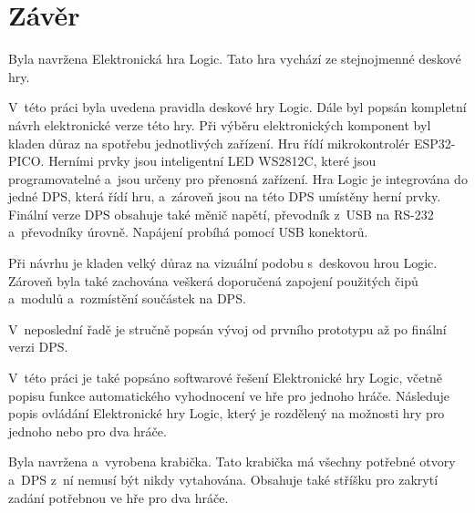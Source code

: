 \chapter*{Závěr}
{}

Byla navržena Elektronická hra Logic. Tato hra vychází ze stejnojmenné deskové hry.

V~této práci byla uvedena pravidla deskové hry Logic. Dále byl popsán kompletní návrh elektronické verze této hry. Při výběru elektronických 
komponent byl kladen důraz na spotřebu jednotlivých zařízení. Hru řídí mikrokontrolér ESP32-PICO. Herními prvky jsou inteligentní LED WS2812C, 
které jsou programovatelné a~jsou určeny pro přenosná zařízení. Hra Logic je integrována do jedné DPS, která řídí hru, a~zároveň jsou na této 
DPS umístěny herní prvky. Finální verze DPS obsahuje také měnič napětí, převodník z~USB na RS-232 a~převodníky úrovně. Napájení probíhá pomocí
USB konektorů.

Při návrhu je kladen velký důraz na vizuální podobu s~deskovou hrou Logic. Zároveň byla také zachována veškerá doporučená zapojení použitých 
čipů a~modulů a~rozmístění součástek na DPS.

V~neposlední řadě je stručně popsán vývoj od prvního prototypu až po finální verzi DPS. 

V~této práci je také popsáno softwarové řešení Elektronické hry Logic, včetně popisu funkce automatického vyhodnocení ve hře pro jednoho hráče.
Následuje popis ovládání Elektronické hry Logic, který je rozdělený na možnosti hry pro jednoho nebo pro dva hráče. 

Byla navržena a~vyrobena krabička. Tato krabička má všechny potřebné otvory a~DPS z~ní nemusí být nikdy vytahována. Obsahuje také stříšku pro
zakrytí zadání potřebnou ve hře pro dva hráče. 